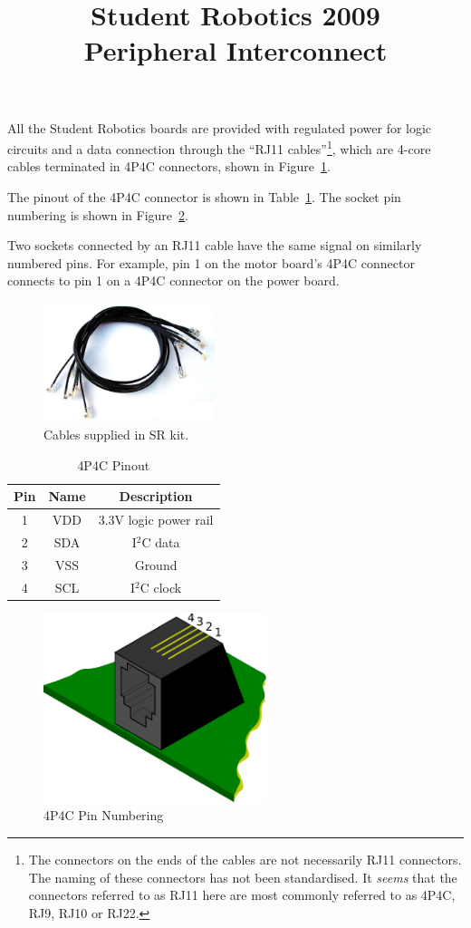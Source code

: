 \documentclass[a4paper,twocolumn]{article}
\title{Student Robotics 2009\\ Peripheral Interconnect}
\newcommand{\itwoc}{I$^2$C }
\begin{document}
\maketitle

All the Student Robotics boards are provided with regulated power for logic circuits and a data connection through the ``RJ11 cables''\footnote{The connectors on the ends of the cables are not necessarily RJ11 connectors.  The naming of these connectors has not been standardised.  It \emph{seems} that the connectors referred to as RJ11 here are most commonly referred to as 4P4C, RJ9, RJ10 or RJ22.}, which are 4-core cables terminated in 4P4C connectors, shown in Figure~\ref{fig:coil}.

The pinout of the 4P4C connector is shown in Table~\ref{tab:4p4c-pinout}.  The socket pin numbering is shown in Figure~\ref{fig:4p4c-pin-num}.

Two sockets connected by an RJ11 cable have the same signal on similarly numbered pins.  For example, pin 1 on the motor board's 4P4C connector connects to pin 1 on a 4P4C connector on the power board.

\begin{figure}
  \begin{center}
    \includegraphics[width=5cm]{./images/coil.jpg}
  \end{center}
  \caption{\label{fig:coil}Cables supplied in SR kit.}
\end{figure}

\begin{table}
  \caption{\label{tab:4p4c-pinout}4P4C Pinout}

  \begin{center}
    \begin{tabular}{|c|c|c|}
      \hline
      \textbf{Pin} & \textbf{Name} & \textbf{Description} \\
      \hline
      1 & VDD & 3.3V logic power rail\\
      2 & SDA & \itwoc data \\
      3 & VSS & Ground \\
      4 & SCL & \itwoc clock\\
      \hline
    \end{tabular}
  \end{center}
\end{table}


\begin{figure}
  \begin{center}
    \includegraphics[width=6.5cm]{./images/4p4c.pdf}
  \end{center}
  \caption{\label{fig:4p4c-pin-num}4P4C Pin Numbering}
\end{figure}
\end{document}

